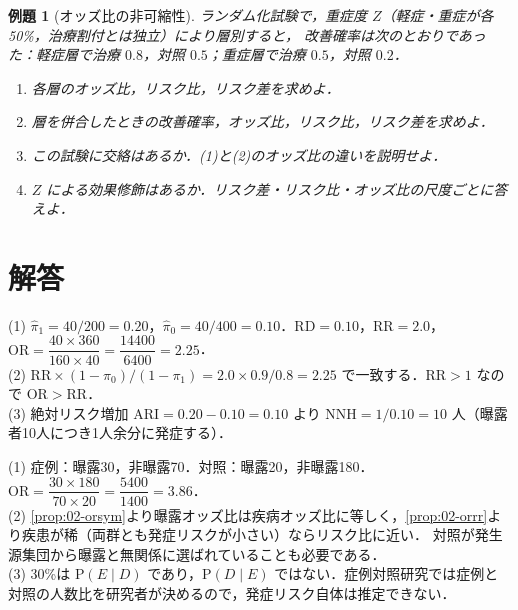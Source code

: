 \documentclass[a4paper,11pt,openany]{ltjsbook}
\newtheorem{reidai}{例題}[chapter]
\newenvironment{kaitou}[1]{%
  \par\medskip\noindent
  \begin{tcolorbox}[enhanced,breakable,colback=bkgray!3,colframe=bkgray!60,boxrule=0.4pt,
    left=4pt,right=4pt,top=2pt,bottom=2pt,arc=1pt,
    title={\cref{#1}の解答},fonttitle=\bfseries\small,coltitle=white,colbacktitle=bkgray!80]}%
  {\end{tcolorbox}\par}
\newcommand{\Prob}{\mathrm{P}}
\newcommand{\RR}{\mathrm{RR}}
\newcommand{\RD}{\mathrm{RD}}
\newcommand{\OR}{\mathrm{OR}}
\begin{document}
\begin{reidai}[オッズ比の非可縮性]\label{reidai:02-3}
ランダム化試験で，重症度 $Z$（軽症・重症が各50\%，治療割付とは独立）により層別すると，
改善確率は次のとおりであった：軽症層で治療 $0.8$，対照 $0.5$；重症層で治療 $0.5$，対照 $0.2$．
\begin{enumerate}[label=(\arabic*)]
\item 各層のオッズ比，リスク比，リスク差を求めよ．
\item 層を併合したときの改善確率，オッズ比，リスク比，リスク差を求めよ．
\item この試験に交絡はあるか．(1)と(2)のオッズ比の違いを説明せよ．
\item $Z$ による効果修飾はあるか．リスク差・リスク比・オッズ比の尺度ごとに答えよ．
\end{enumerate}
\end{reidai}

\section{解答}\label{sec:02-sol}
\begin{kaitou}{reidai:02-1}
(1) $\hat\pi_1=40/200=0.20$，$\hat\pi_0=40/400=0.10$．$\RD=0.10$，$\RR=2.0$，
$\OR=\dfrac{40\times360}{160\times40}=\dfrac{14400}{6400}=2.25$．\\
(2) $\RR\times(1-\pi_0)/(1-\pi_1)=2.0\times0.9/0.8=2.25$ で一致する．$\RR>1$ なので $\OR>\RR$．\\
(3) 絶対リスク増加 $\mathrm{ARI}=0.20-0.10=0.10$ より $\mathrm{NNH}=1/0.10=10$ 人（曝露者10人につき1人余分に発症する）．
\end{kaitou}

\begin{kaitou}{reidai:02-2}
(1) 症例：曝露30，非曝露70．対照：曝露20，非曝露180．$\OR=\dfrac{30\times180}{70\times20}=\dfrac{5400}{1400}=3.86$．\\
(2) \cref{prop:02-orsym}より曝露オッズ比は疾病オッズ比に等しく，\cref{prop:02-orrr}より疾患が稀（両群とも発症リスクが小さい）ならリスク比に近い．
対照が発生源集団から曝露と無関係に選ばれていることも必要である．\\
(3) 30\%は $\Prob(E\mid D)$ であり，$\Prob(D\mid E)$ ではない．症例対照研究では症例と対照の人数比を研究者が決めるので，発症リスク自体は推定できない．
\end{kaitou}
\end{document}
